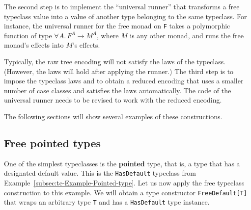 The second step is to implement the \textsf{``}universal runner\textsf{''} that transforms
a free typeclass value into a value of another type belonging to the
same typeclass. For instance, the universal runner for the free monad
on \lstinline!F! takes
a polymorphic function of type $\forall A.\,F^{A}\rightarrow M^{A}$,
where $M$ is any other monad, and runs the free monad\textsf{'}s effects into
$M$\textsf{'}s effects.

Typically, the raw tree encoding will not satisfy the laws of the
typeclass. (However, the laws will hold after applying the runner.)
The third step is to impose the typeclass laws and to obtain a reduced
encoding that uses a smaller number of case classes and satisfies
the laws automatically. The code of the universal runner needs to
be revised to work with the reduced encoding.

The following sections will show several examples of these constructions.

\subsection{Free pointed types}

One of the simplest typeclasses is the \textbf{pointed}
type, that is, a type that has a designated default value. This is
the \lstinline!HasDefault!
typeclass from Example~\ref{subsec:tc-Example-Pointed-type}. Let
us now apply the free typeclass construction to this example. We will
obtain a type constructor \lstinline!FreeDefault[T]!
that wraps an arbitrary type \lstinline!T!
and has a \lstinline!HasDefault!
type instance.

